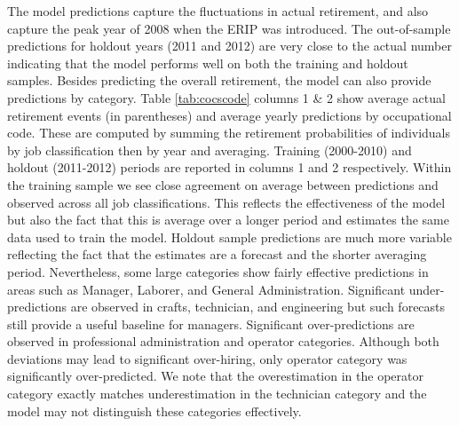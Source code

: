 \documentclass[12pt,letterpaper]{article}
\begin{document}
 The model predictions capture the fluctuations in actual retirement, and also capture the peak year of 2008 when the ERIP was introduced. The out-of-sample predictions for holdout years (2011 and 2012) are very close to the actual number indicating that the model performs well on both the training and holdout samples. Besides predicting the overall retirement, the model can also provide predictions by category. Table \ref{tab:cocscode} columns 1 \& 2 show average actual retirement events (in parentheses) and average yearly predictions by occupational code. These are computed by summing the retirement probabilities of individuals by job classification then by year and averaging.  Training (2000-2010) and holdout (2011-2012) periods are reported in columns 1 and 2 respectively.  Within the training sample we see close agreement on average between predictions and observed across all job classifications. This reflects the effectiveness of the model but also the fact that this is average over a longer period and estimates the same data used to train the model.  Holdout sample predictions are much more variable reflecting the fact that the estimates are a forecast and the shorter averaging period.  Nevertheless, some large categories show fairly effective predictions in areas such as Manager, Laborer, and General Administration.  Significant under-predictions are observed in crafts, technician, and engineering but such forecasts still provide a useful baseline for managers.  Significant over-predictions are observed in professional administration and operator categories. Although both deviations may lead to significant over-hiring, only operator category was significantly over-predicted.  We note that the overestimation in the operator category exactly matches underestimation in the technician category and the model may not distinguish these categories effectively.%
\end{document}

